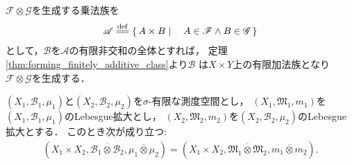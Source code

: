 		\begin{prf}
			$\mathscr{F} \otimes \mathscr{G}$を生成する乗法族を
			\begin{align}
				\mathscr{A} \defeq \Set{A \times B}{A \in \mathscr{F} \wedge B \in \mathscr{G}}
			\end{align}
			として，$\mathscr{B}$を$\mathscr{A}$の有限非交和の全体とすれば，
			定理\ref{thm:forming_finitely_additive_class}より$\mathscr{B}$
			は$X \times Y$上の有限加法族となり$\mathscr{F} \otimes \mathscr{G}$を生成する．
		\end{prf}
		
		\begin{screen}
			\begin{thm}[直積空間のLebesgue拡大はLebesgue拡大の直積空間のLebesgue拡大に一致する]
			\label{thm:product_space_of_complete_measure_space}
				$(X_1,\mathcal{B}_1,\mu_1)$と$(X_2,\mathcal{B}_2,\mu_2)$を$\sigma$-有限な測度空間とし，
				$\left( X_1,\mathfrak{M}_1,m_1 \right)$を$(X_1,\mathcal{B}_1,\mu_1)$のLebesgue拡大とし，
				$\left( X_2,\mathfrak{M}_2,m_2 \right)$を$(X_2,\mathcal{B}_2,\mu_2)$のLebesgue拡大とする．
				このとき次が成り立つ:
				\begin{align}
					\left( X_1 \times X_2, \overline{\mathcal{B}_1 \otimes \mathcal{B}_2}, \overline{\mu_1 \otimes \mu_2} \right)
					= \left( X_1 \times X_2, \overline{\mathfrak{M}_1 \otimes \mathfrak{M}_2}, \overline{m_1 \otimes m_2} \right).
				\end{align}
			\end{thm}
		\end{screen}
		
